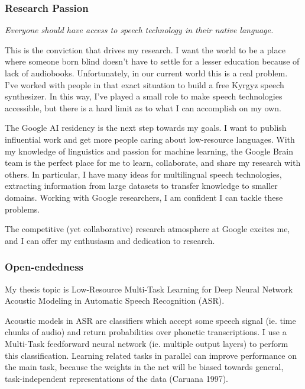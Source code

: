 \documentclass[12pt,a4paper]{article}
\begin{document}
\subsubsection*{Research Passion}



\begin{center}
\textit{Everyone should have access to speech technology in their native language.}
\end{center}

This is the conviction that drives my research. I want the world to be a place where someone born blind doesn't have to settle for a lesser education because of lack of audiobooks. Unfortunately, in our current world this is a real problem. I've worked with people in that exact situation to build a free Kyrgyz speech synthesizer. In this way, I've played a small role to make speech technologies accessible, but there is a hard limit as to what I can accomplish on my own.

The Google AI residency is the next step towards my goals. I want to publish influential work and get more people caring about low-resource languages. With my knowledge of linguistics and passion for machine learning, the Google Brain team is the perfect place for me to learn, collaborate, and share my research with others. In particular, I have many ideas for multilingual speech technologies, extracting information from large datasets to transfer knowledge to smaller domains. Working with Google researchers, I am confident I can tackle these problems.

The competitive (yet collaborative) research atmosphere at Google excites me, and I can offer my enthusiasm and dedication to research. 


\subsubsection*{Open-endedness}

My thesis topic is Low-Resource Multi-Task Learning for Deep Neural Network Acoustic Modeling in Automatic Speech Recognition (ASR).

Acoustic models in ASR are classifiers which accept some speech signal (ie. time chunks of audio) and return probabilities over phonetic transcriptions. I use a Multi-Task feedforward neural network (ie. multiple output layers) to perform this classification. Learning related tasks in parallel can improve performance on the main task, because the weights in the net will be biased towards general, task-independent representations of the data (Caruana 1997).
\end{document}

